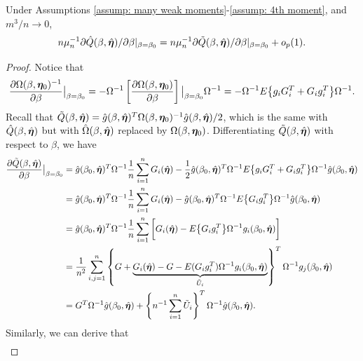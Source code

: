 \documentclass[12pt]{article}
\begin{document}
{\begin{lemma} \label{lemma: Q tilde} Under Assumptions \ref{assump: many weak moments}-\ref{assump: 4th moment},  and $ m^3/n\rightarrow 0  $, 
	   $$n\mu_n^{-1}\partial \hat Q(\beta, \hat{\bm \eta})/\partial \beta |_{\beta=\beta_0}=n\mu_n^{-1}\partial \tilde  Q(\beta, \hat{\bm \eta})/\partial \beta |_{\beta=\beta_0} +o_p(1).$$  
\end{lemma}
\begin{proof}
Notice that 
\begin{align*}
	\frac{\partial \Omega(\beta,  \bm \eta_0)^{-1}}{\partial \beta} \big|_{\beta= \beta_0}= - \Omega^{-1}\left[ \frac{\partial \Omega(\beta, \bm \eta_0)}{\partial \beta}\right] \big|_{\beta=\beta_0}  \Omega^{-1}= - \Omega^{-1} E\big\{ g_i G_i^T + G_i g_i^T\big\} \Omega^{-1}. 
\end{align*}
Recall that $\tilde{Q}(\beta, \hat {\bm \eta}) = \hat g (\beta, \hat{\bm \eta})^T \Omega (\beta, \bm \eta_0)^{-1} \hat g (\beta, \hat{\bm \eta})/2   $, which is the same with $\hat{Q}(\beta, \hat{\bm \eta})   $ but with $ \hat \Omega({\beta}, \hat {\bm \eta}) $ replaced by  $ \Omega(\beta, \bm \eta_0) $. Differentiating $\tilde{Q}(\beta, \hat{\bm \eta}) $ with respect to $\beta$, we have
\begin{align*}
	\frac{\partial \tilde{Q} (\beta, \hat {\bm \eta})}{\partial \beta}  \big|_{\beta= \beta_0} &=\hat{g} (\beta_0, \hat{\bm \eta})^T \Omega^{-1} \frac{1}{n} \sum_{i=1}^n G_i( \hat{\bm \eta})  - \frac{1}{2} \hat{g} (\beta_0, \hat{\bm \eta})^T \Omega^{-1} E\big\{ g_i G_i^T + G_i g_i^T\big\} \Omega^{-1}  \hat{g} (\beta_0, \hat{\bm \eta})\\
	&= \hat{g} (\beta_0, \hat{\bm \eta})^T \Omega^{-1} \frac{1}{n} \sum_{i=1}^n G_i(\hat{\bm \eta}) -  \hat{g} (\beta_0, \hat{\bm \eta})^T \Omega^{-1} E\big\{  G_i g_i^T\big\} \Omega^{-1}  \hat{g} (\beta_0, \hat{\bm \eta})\\
	&= \hat{g} (\beta_0, \hat{\bm \eta})^T \Omega^{-1} \frac{1}{n} \sum_{i=1}^n \bigg[ G_i(\hat {\bm \eta})- E\big\{  G_i g_i^T\big\} \Omega^{-1}  g_i (\beta_0, \hat{\bm \eta})\bigg]\\
	&= \frac{1}{n^2} \sum_{i, j=1}^n \left\{ G+ \underbrace{G_i(\hat{\bm \eta}) - G - E(G_i g_i^T) \Omega^{-1} g_i(\beta_0, \hat{\bm \eta})}_{\tilde U_i} \right\}^T \Omega^{-1} g_j (\beta_0, \hat{\bm \eta})\\
	&= G^T \Omega^{-1} \hat g(\beta_0, \hat{\bm \eta}) + \left\{n^{-1} \sum_{i=1}^n \tilde U_i \right\}^T \Omega^{-1} \hat g(\beta_0, \hat {\bm \eta}).
\end{align*}
Similarly, we can derive that 
\begin{align*}

\end{align*}
\end{proof}}
\end{document}
